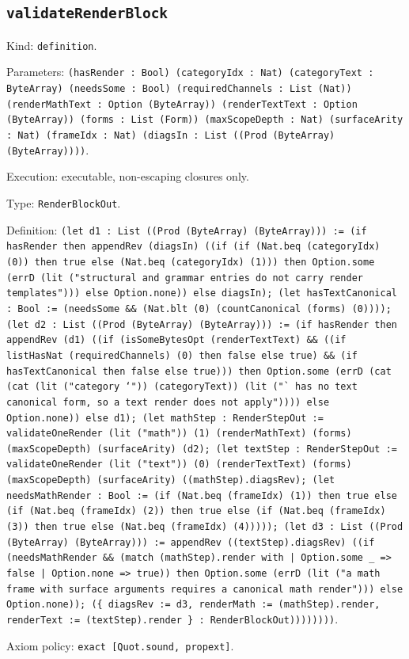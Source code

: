 \documentclass[11pt]{article}
\begin{document}
\subsection*{\texttt{validateRenderBlock}}
\noindent Kind: \texttt{definition}.\par
\noindent Parameters: \texttt{(hasRender : Bool) (categoryIdx : Nat) (categoryText : ByteArray) (needsSome : Bool) (requiredChannels : List (Nat)) (renderMathText : Option (ByteArray)) (renderTextText : Option (ByteArray)) (forms : List (Form)) (maxScopeDepth : Nat) (surfaceArity : Nat) (frameIdx : Nat) (diagsIn : List ((Prod (ByteArray) (ByteArray))))}.\par
\noindent Execution: executable, non-escaping closures only.\par
\noindent Type: \texttt{RenderBlockOut}.\par
\noindent Definition: \texttt{(let d1 : List ((Prod (ByteArray) (ByteArray))) := (if hasRender then appendRev (diagsIn) ((if (if (Nat.beq (categoryIdx) (0)) then true else (Nat.beq (categoryIdx) (1))) then Option.some (errD (lit ("structural and grammar entries do not carry render templates"))) else Option.none)) else diagsIn); (let hasTextCanonical : Bool := (needsSome \&\& (Nat.blt (0) (countCanonical (forms) (0)))); (let d2 : List ((Prod (ByteArray) (ByteArray))) := (if hasRender then appendRev (d1) ((if (isSomeBytesOpt (renderTextText) \&\& ((if listHasNat (requiredChannels) (0) then false else true) \&\& (if hasTextCanonical then false else true))) then Option.some (errD (cat (cat (lit ("category `")) (categoryText)) (lit ("` has no text canonical form, so a text render does not apply")))) else Option.none)) else d1); (let mathStep : RenderStepOut := validateOneRender (lit ("math")) (1) (renderMathText) (forms) (maxScopeDepth) (surfaceArity) (d2); (let textStep : RenderStepOut := validateOneRender (lit ("text")) (0) (renderTextText) (forms) (maxScopeDepth) (surfaceArity) ((mathStep).diagsRev); (let needsMathRender : Bool := (if (Nat.beq (frameIdx) (1)) then true else (if (Nat.beq (frameIdx) (2)) then true else (if (Nat.beq (frameIdx) (3)) then true else (Nat.beq (frameIdx) (4))))); (let d3 : List ((Prod (ByteArray) (ByteArray))) := appendRev ((textStep).diagsRev) ((if (needsMathRender \&\& (match (mathStep).render with | Option.some \_ => false | Option.none => true)) then Option.some (errD (lit ("a math frame with surface arguments requires a canonical math render"))) else Option.none)); (\{ diagsRev := d3, renderMath := (mathStep).render, renderText := (textStep).render \} : RenderBlockOut))))))))}.\par
\noindent Axiom policy: \texttt{exact [Quot.sound, propext]}.\par
\end{document}
